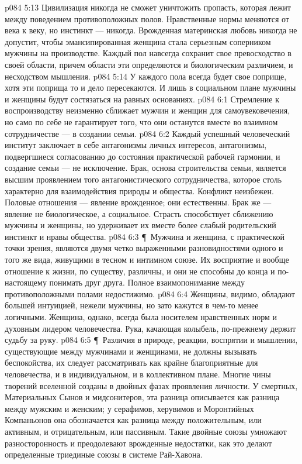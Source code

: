 \vs p084 5:13 Цивилизация никогда не сможет уничтожить пропасть, которая лежит между поведением противоположных полов. Нравственные нормы меняются от века к веку, но инстинкт --- никогда. Врожденная материнская любовь никогда не допустит, чтобы эмансипированная женщина стала серьезным соперником мужчины на производстве. Каждый пол навсегда сохранит свое превосходство в своей области, причем области эти определяются и биологическим различием, и несходством мышления.
\vs p084 5:14 У каждого пола всегда будет свое поприще, хотя эти поприща то и дело пересекаются. И лишь в социальном плане мужчины и женщины будут состязаться на равных основаниях.
\vs p084 6:1 Стремление к воспроизводству неизменно сближает мужчин и женщин для самоувековечения, но само по себе не гарантирует того, что они останутся вместе во взаимном сотрудничестве --- в создании семьи.
\vs p084 6:2 Каждый успешный человеческий институт заключает в себе антагонизмы личных интересов, антагонизмы, подвергшиеся согласованию до состояния практической рабочей гармонии, и создание семьи --- не исключение. Брак, основа строительства семьи, является высшим проявлением того антагонистического сотрудничества, которое столь характерно для взаимодействия природы и общества. Конфликт неизбежен. Половые отношения --- явление врожденное; они естественны. Брак же --- явление не биологическое, а социальное. Страсть способствует сближению мужчины и женщины, но удерживает их вместе более слабый родительский инстинкт и нравы общества.
\vs p084 6:3 \P\ Мужчина и женщина, с практической точки зрения, являются двумя четко выраженными разновидностями одного и того же вида, живущими в тесном и интимном союзе. Их восприятие и вообще отношение к жизни, по существу, различны, и они не способны до конца и по\hyp{}настоящему понимать друг друга. Полное взаимопонимание между противоположными полами недостижимо.
\vs p084 6:4 Женщины, видимо, обладают большей интуицией, нежели мужчины, но зато кажутся в чем\hyp{}то менее логичными. Женщина, однако, всегда была носителем нравственных норм и духовным лидером человечества. Рука, качающая колыбель, по\hyp{}прежнему держит судьбу за руку.
\vs p084 6:5 \P\ Различия в природе, реакции, воспрятии и мышлении, существующие между мужчинами и женщинами, не должны вызывать беспокойства, их следует рассматривать как крайне благоприятные для человечества, и в индивидуальном, и в коллективном плане. Многие чины творений вселенной созданы в двойных фазах проявления личности. У смертных, Материальных Сынов и мидсонитеров, эта разница описывается как разница между мужским и женским; у серафимов, херувимов и Моронтийных Компаньонов она обозначается как разница между положительным, или активным, и отрицательным, или пассивным. Такие двойные союзы умножают разносторонность и преодолевают врожденные недостатки, как это делают определенные триединые союзы в системе Рай\hyp{}Хавона.

